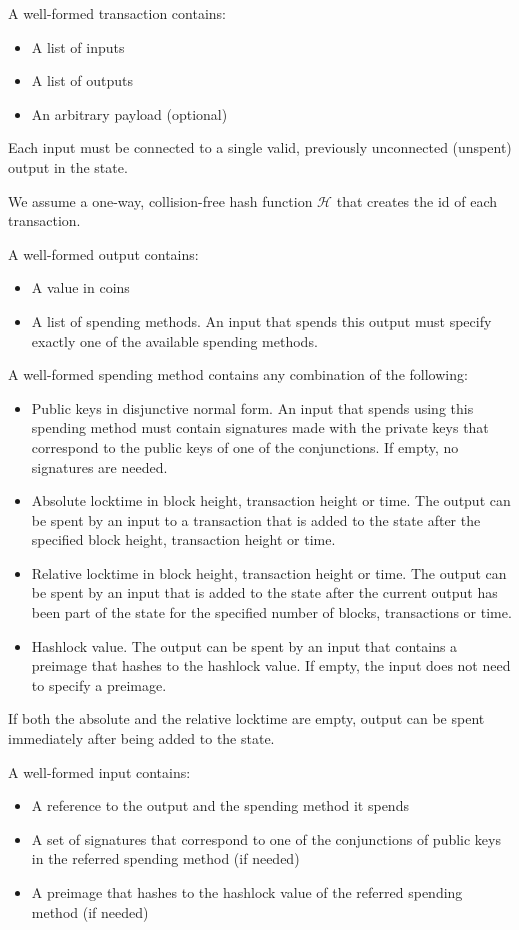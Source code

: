 A well-formed transaction contains:
\begin{itemize}
  \item A list of inputs
  \item A list of outputs
  \item An arbitrary payload (optional)
\end{itemize}
Each input must be connected to a single valid, previously unconnected (unspent)
output in the state.

We assume a one-way, collision-free hash function $\mathcal{H}$ that creates the
id of each transaction.

A well-formed output contains:
\begin{itemize}
  \item A value in coins
  \item A list of spending methods. An input that spends this output must
  specify exactly one of the available spending methods.
\end{itemize}

A well-formed spending method contains any combination of the following:
\begin{itemize}
  \item Public keys in disjunctive normal form. An input that spends using this
  spending method must contain signatures made with the private keys that
  correspond to the public keys of one of the conjunctions. If empty, no
  signatures are needed.
  \item Absolute locktime in block height, transaction height or time. The
  output can be spent by an input to a transaction that is added to the state
  after the specified block height, transaction height or time.
  \item Relative locktime in block height, transaction height or time. The
  output can be spent by an input that is added to the state after the current
  output has been part of the state for the specified number of blocks,
  transactions or time.
  \item Hashlock value. The output can be spent by an input that contains a
  preimage that hashes to the hashlock value. If empty, the input does not need
  to specify a preimage.
\end{itemize}
If both the absolute and the relative locktime are empty, output can be spent
immediately after being added to the state.

A well-formed input contains:
\begin{itemize}
  \item A reference to the output and the spending method it spends
  \item A set of signatures that correspond to one of the conjunctions of public
  keys in the referred spending method (if needed)
  \item A preimage that hashes to the hashlock value of the referred spending
  method (if needed)
\end{itemize}

